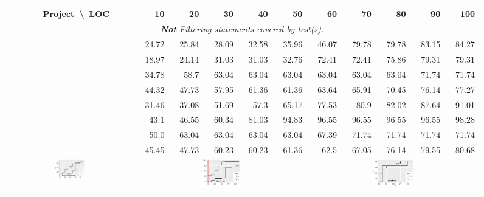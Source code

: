 \documentclass[sigplan,10pt,review,anonymous]{acmart}\settopmatter{printfolios=true,printccs=false,printacmref=false}
\begin{document}
\begin{figure}[!ht]
  \centering
    \begin{tabular}{cl|rrrrrrrrrr}
      \toprule
      & \multicolumn{1}{c|}{Project~\textbackslash{}~LOC}             & 10  & 20  & 30  &  40  & 50  & 60 & 70 &  80 &  90& 100 \\
      \midrule

      \multicolumn{12}{c}{\emph{\textbf{Not} Filtering statements covered by test(s).}}\\
      \midrule
      \parbox[t]{2mm}{}
      & \lang{}       & 24.72 & 25.84 & 28.09 & 32.58 & 35.96 & 46.07 & 79.78 & 79.78 & 83.15 & 84.27 \\
      & \chart{}      & 18.97 & 24.14 & 31.03 & 31.03 & 32.76 & 72.41 & 72.41 & 75.86 & 79.31 & 79.31 \\
      & \jtime{}      & 34.78 & 58.7  & 63.04 & 63.04 & 63.04 & 63.04 & 63.04 & 63.04 & 71.74 & 71.74 \\
      & \mockito{}    & 44.32 & 47.73 & 57.95 & 61.36 & 61.36 & 63.64 & 65.91 & 70.45 & 76.14 & 77.27 \\
      \hline
      \parbox[t]{2mm}{}
      & \lang{}       & 31.46 & 37.08 & 51.69 & 57.3  & 65.17 & 77.53 & 80.9  & 82.02 & 87.64 & 91.01 \\
      & \chart{}      & 43.1  & 46.55 & 60.34 & 81.03 & 94.83 & 96.55 & 96.55 & 96.55 & 96.55 & 98.28 \\
      & \jtime{}      & 50.0  & 63.04 & 63.04 & 63.04 & 63.04 & 67.39 & 71.74 & 71.74 & 71.74 & 71.74 \\
      & \mockito{}    & 45.45 & 47.73 & 60.23 & 60.23 & 61.36 & 62.5  & 67.05 & 76.14 & 79.55 & 80.68 \\
      \midrule

      &
      &
      \\


\end{tabular}
\end{figure}
\end{document}
